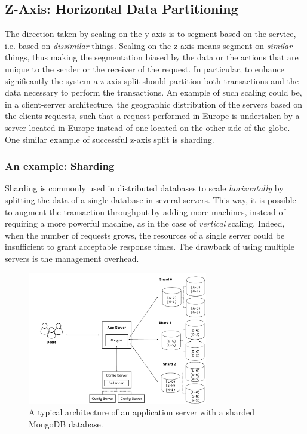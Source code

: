 \subsection{Z-Axis: Horizontal Data Partitioning}
\label{sec:z-axis}

The direction taken by scaling on the y-axis is to segment based on the service,
i.e. based on \emph{dissimilar} things. Scaling on the z-axis means segment on
\emph{similar} things, thus making the segmentation biased by the data or the
actions that are unique to the sender or the receiver of the request. In
particular, to enhance significantly the system a z-axis split should partition
both transactions and the data necessary to perform the transactions. An example
of such scaling could be, in a client-server architecture, the geographic
distribution of the servers based on the clients requests, such that a request
performed in Europe is undertaken by a server located in Europe instead of one
located on the other side of the globe. One similar example of successful z-axis
split is sharding.

\subsubsection{An example: Sharding}
Sharding is commonly used in distributed databases to scale \emph{horizontally}
by splitting the data of a single database in several servers. This way, it is
possible to augment the transaction throughput by adding more machines, instead
of requiring a more powerful machine, as in the case of \emph{vertical} scaling.
Indeed, when the number of requests grows, the resources of a single server
could be insufficient to grant acceptable response times. The drawback of using
multiple servers is the management overhead.

\begin{figure}
  \begin{center}
    \includegraphics[width=0.7\textwidth]{./res/img/mongodb}
    \caption{A typical architecture of an application server with a sharded
    MongoDB database.}
    \label{fig:mongodb}
  \end{center}
\end{figure}

